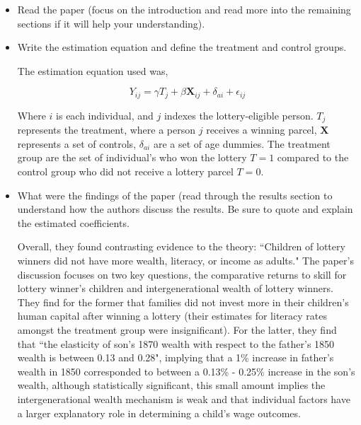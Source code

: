 \documentclass[../Main.tex]{subfiles}
\begin{document}
\begin{refsection}
\begin{itemize}
    \begin{itemize}
    
        \item Read the paper (focus on the introduction and read more into the
        remaining sections if it will help your understanding).
        
        \item Write the estimation equation and define the treatment and control
        groups.
    
        \begin{answer}
            The estimation equation used was, 
        
            $$Y_{ij} = \gamma T_j + \beta \mathbf{X}_{ij} + \delta_{ai} + \epsilon_{ij}$$
            
            Where $i$ is each individual, and $j$ indexes the lottery-eligible
            person. $T_j$ represents the treatment, where a person $j$ receives
            a winning parcel, $\mathbf{X}$ represents a set of controls,
            $\delta_{ai}$ are a set of age dummies. The treatment group are the
            set of individual's who won the lottery $T = 1$ compared to the
            control group who did not receive a lottery parcel $T=0$.
            
        \end{answer}
        
        \item What were the findings of the paper (read through the results
        section to understand how the authors discuss the results. Be sure to
        quote and explain the estimated coefficients.
    
        \begin{answer}
        
            Overall, they found contrasting evidence to the theory: ``Children
            of lottery winners did not have more wealth, literacy, or income as
            adults." The paper's discussion focuses on two key questions, the
            comparative returns to skill for lottery winner's children and
            intergenerational wealth of lottery winners. They find for the
            former that families did not invest more in their children's human
            capital after winning a lottery (their estimates for literacy rates
            amongst the treatment group were insignificant). For the latter,
            they find that ``the elasticity of son's 1870 wealth with respect to
            the father's 1850 wealth is between 0.13 and 0.28", implying that a
            1\% increase in father's wealth in 1850 corresponded to between a
            0.13\% - 0.25\% increase in the son's wealth, although statistically
            significant, this small amount implies the intergenerational wealth
            mechanism is weak and that individual factors have a larger
            explanatory role in determining a child's wage outcomes. 
            

\end{answer}
\end{itemize}
\end{itemize}
\end{refsection}
\end{document}
